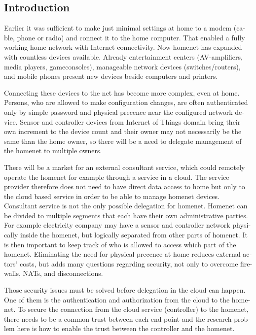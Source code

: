 \documentclass[12pt,a4paper,english]{tutthesis}
\begin{document}
\begin{otherlanguage}{english}
\chapter{Introduction}
\label{sec-1}
\label{cha:intro}



Earlier it was sufficient to make just minimal settings at home to
a modem (cable, phone or radio) and connect it to
the home computer. That enabled a fully working home network
with Internet connectivity.  Now homenet has expanded with countless
devices available.
Already entertainment centers (AV-amplifiers, media players, gameconsoles),
manageable network devices (switches/routers), and mobile phones
present new devices beside computers and printers.

Connecting these devices to the net has become more complex, even at home.
Persons, who are allowed to make configuration changes, are often
authenticated only by simple password  and physical precence
near the configured network device.
 Sensor and controller devices from Internet of Things domain bring
their own increment to the device count and their owner may not
necessarily be the same than the home owner, so there will be a need to
delegate management of the homenet to multiple owners.  



There will be a market for an external consultant service, which could
remotely operate the homenet for example through a service in a cloud. 
The service provider therefore does not need to have direct data
access to home but only to the cloud based service in order to be able to
manage homenet devices.
Consultant service is not the only possible delegation for homenet.
Homenet can be divided to multiple segments that each have
their own administrative parties. For example electricity company may
have a sensor and controller network physically inside the homenet, but
logically separated from other parts of homenet. It is then
important to keep track of who is allowed to access which part of the homenet.
Eliminating the need for 
physical precence at home reduces external actors' costs, but adds many questions
regarding security, not only to overcome firewalls, NATs, and disconnections.







Those security issues must be solved before delegation in the cloud can
happen. One of them is the authentication and authorization 
from the cloud to the homenet.
To secure the connection from the cloud service (controller)
to the homenet, there needs to be a common trust between each end
point and the research problem here is how to enable the trust between the
controller and the homenet.  


\end{otherlanguage}
\end{document}
